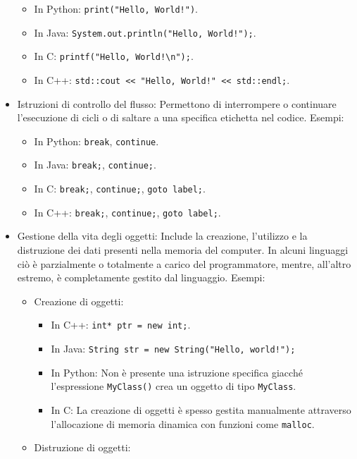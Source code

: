 \documentclass[
  letterpaper,
]{scrbook}
\providecommand{\tightlist}{%
  \setlength{\itemsep}{0pt}\setlength{\parskip}{0pt}}\usepackage{longtable,booktabs,array}
\begin{document}
\begin{itemize}
  \begin{itemize}
  \tightlist
  \item
    In Python: \texttt{print("Hello,\ World!")}.
  \item
    In Java: \texttt{System.out.println("Hello,\ World!");}.
  \item
    In C: \texttt{printf("Hello,\ World!\textbackslash{}n");}.
  \item
    In C++:
    \texttt{std::cout\ \textless{}\textless{}\ "Hello,\ World!"\ \textless{}\textless{}\ std::endl;}.
  \end{itemize}
\item
  Istruzioni di controllo del flusso: Permettono di interrompere o
  continuare l'esecuzione di cicli o di saltare a una specifica
  etichetta nel codice. Esempi:

  \begin{itemize}
  \tightlist
  \item
    In Python: \texttt{break}, \texttt{continue}.
  \item
    In Java: \texttt{break;}, \texttt{continue;}.
  \item
    In C: \texttt{break;}, \texttt{continue;}, \texttt{goto\ label;}.
  \item
    In C++: \texttt{break;}, \texttt{continue;}, \texttt{goto\ label;}.
  \end{itemize}
\item
  Gestione della vita degli oggetti: Include la creazione, l'utilizzo e
  la distruzione dei dati presenti nella memoria del computer. In alcuni
  linguaggi ciò è parzialmente o totalmente a carico del programmatore,
  mentre, all'altro estremo, è completamente gestito dal linguaggio.
  Esempi:

  \begin{itemize}
  \tightlist
  \item
    Creazione di oggetti:

    \begin{itemize}
    \tightlist
    \item
      In C++: \texttt{int*\ ptr\ =\ new\ int;}.
    \item
      In Java: \texttt{String\ str\ =\ new\ String("Hello,\ world!");}
    \item
      In Python: Non è presente una istruzione specifica giacché
      l'espressione \texttt{MyClass()} crea un oggetto di tipo
      \texttt{MyClass}.
    \item
      In C: La creazione di oggetti è spesso gestita manualmente
      attraverso l'allocazione di memoria dinamica con funzioni come
      \texttt{malloc}.
    \end{itemize}
  \item
    Distruzione di oggetti:


\end{itemize}
\end{itemize}
\end{document}
